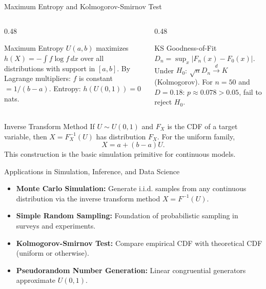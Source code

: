 \documentclass[aspectratio=169,xcolor={dvipsnames,table}]{beamer}
\begin{document}
\begin{frame}{Maximum Entropy and Kolmogorov-Smirnov Test}
	\vspace{-0.15cm}
	\begin{columns}[T]
		\begin{column}{0.48\textwidth}
			\begin{block}{Maximum Entropy}
				\footnotesize
				$U(a, b)$ maximizes $h(X) = -\int f \log f\,dx$ over all distributions with support in $[a, b]$. By Lagrange multipliers: $f$ is constant $= 1/(b-a)$. Entropy: $h(U(0,1)) = 0$ nats.
			\end{block}
		\end{column}
		\begin{column}{0.48\textwidth}
			\begin{alertblock}{KS Goodness-of-Fit}
				\footnotesize
				$D_{n} = \sup_{x} |F_{n}(x) - F_{0}(x)|$. Under $H_{0}$: $\sqrt{n} D_{n} \xrightarrow{d} K$ (Kolmogorov). For $n = 50$ and $D = 0.18$: $p \approx 0.078 > 0.05$, fail to reject $H_{0}$.
			\end{alertblock}
		\end{column}
	\end{columns}
\end{frame}

\begin{frame}{Inverse Transform Method}
\scriptsize
If $U\sim U(0,1)$ and $F_X$ is the CDF of a target variable, then
$X=F_X^{-1}(U)$ has distribution $F_X$. For the uniform family,
\[
X=a+(b-a)U.
\]
This construction is the basic simulation primitive for continuous models.
\end{frame}

\begin{frame}{Applications in Simulation, Inference, and Data Science}
	\vspace{-0.1cm}
	\begin{itemize}\itemsep=0.1cm
		\item \textbf{Monte Carlo Simulation:} Generate i.i.d. samples from any continuous distribution via the inverse transform method $X = F^{-1}(U)$. \pause
		\item \textbf{Simple Random Sampling:} Foundation of probabilistic sampling in surveys and experiments. \pause
		\item \textbf{Kolmogorov-Smirnov Test:} Compare empirical CDF with theoretical CDF (uniform or otherwise). \pause
		\item \textbf{Pseudorandom Number Generation:} Linear congruential generators approximate $U(0, 1)$.
	\end{itemize}
\end{frame}
\end{document}
